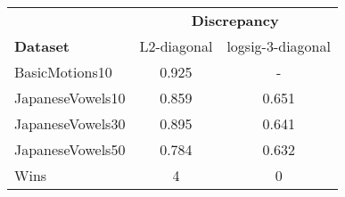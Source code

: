 \begin{tabular}{lcc}
\toprule
& \multicolumn{2}{c}{\textbf{Discrepancy}} \\
\textbf{Dataset} &  L2-diagonal &  logsig-3-diagonal \\
\midrule
BasicMotions10   &        0.925 &                  - \\
JapaneseVowels10 &        0.859 &              0.651 \\
JapaneseVowels30 &        0.895 &              0.641 \\
JapaneseVowels50 &        0.784 &              0.632 \\ 
\midrule
Wins &            4 &                  0 \\
\bottomrule
\end{tabular}
